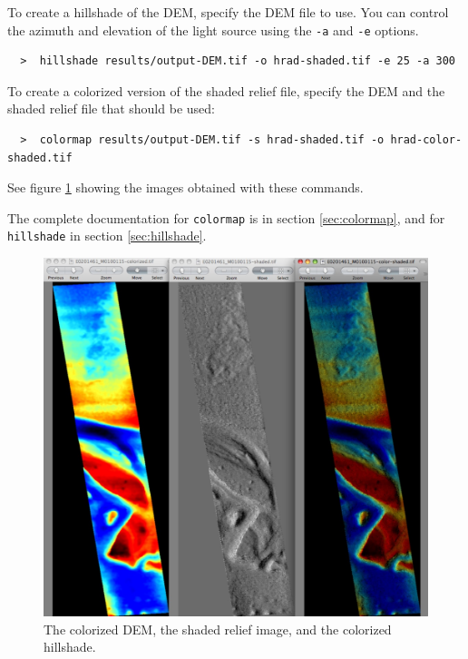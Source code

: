 To create a hillshade of the \ac{DEM}, specify the \ac{DEM} file to
use. You can control the azimuth and elevation of the light source
using the \texttt{-a} and \texttt{-e} options.

\begin{verbatim}
  >  hillshade results/output-DEM.tif -o hrad-shaded.tif -e 25 -a 300
\end{verbatim}

To create a colorized version of the shaded relief file, specify
the \ac{DEM} and the shaded relief file that should be used:

\begin{verbatim}
  >  colormap results/output-DEM.tif -s hrad-shaded.tif -o hrad-color-shaded.tif
\end{verbatim}

See figure \ref{hrad-color} showing the images obtained with these commands.

The complete documentation for \texttt{colormap} is in section
\ref{sec:colormap}, and for \texttt{hillshade} in section \ref{sec:hillshade}.

\begin{figure}[b!]
\begin{center}
\includegraphics[width=4.7in]{images/p19-colorized-shaded_500px.png}
\caption[Hrad colorized and shaded relief]{
  \label{hrad-color}
  The colorized DEM, the shaded relief image, and the colorized hillshade.
}
\end{center}
\end{figure}

